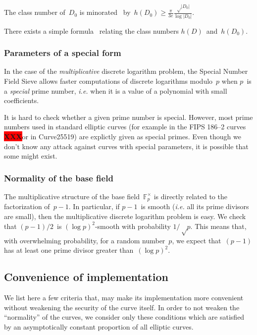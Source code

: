 \documentclass{article}
\def\F{\mathbb{F}}
\def\abs#1{\left|#1\right|}
\def\pa#1{\left(#1\right)}
\def\XXX{{\colorbox{red}{{\color{white}\bfseries XXX}}}}
\begin{document}
\medbreak

The class number of~$D_0$ is minorated~\cite{cras1990louboutin}
by~$h(D_0) ≥ \frac{π}{3e} \frac{√{\abs{D_0}}}{\log \abs{D_0}}$.

There exists a simple formula~\cite[7.24]{cox1989primes}
relating the class numbers $h(D)$~and~$h(D_0)$.


\subsubsection{Parameters of a special form}

In the case of the \emph{multiplicative} discrete logarithm problem,
the Special Number Field Sieve allows faster computations
of discrete logarithms modulo~$p$
when $p$~is a \emph{special} prime number,
\emph{i.e.} when it is a value of a polynomial with small coefficients.

It is hard to check whether a given prime number is special.
However, most prime numbers used in standard elliptic curves
(for example in the FIPS 186--2 curves \XXX or in Curve25519)
are explictly given as special primes.
Even though we don't know any attack against curves with special parameters,
it is possible that some might exist.

\subsubsection{Normality of the base field}

The multiplicative structure of the base field~$\F_p^{×}$
is directly related to the factorization of~$p-1$.
In particular, if $p-1$~is smooth
(\emph{i.e.} all its prime divisors are small),
then the multiplicative discrete logarithm problem is easy.
We check~\cite{jnt1983cep} that
$(p-1)/2$~is $\pa{\log p}^2$-smooth with probability $1/√p$.
This means that, with overwhelming probability,
for a random number~$p$, we expect that~$(p-1)$
has at least one prime divisor greater than~$(\log p)^2$.

\subsection{Convenience of implementation}

We list here a few criteria that,
may make its implementation more convenient
without weakening the security of the curve itself.
In order to not weaken the ``normality'' of the curves,
we consider only these conditions which are satisfied
by an asymptotically constant proportion of all elliptic curves.
\end{document}
